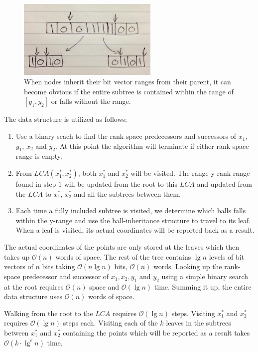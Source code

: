 \begin{figure}[H]
    \centering
    \includegraphics[width=0.6\textwidth]{pictures/bit_vector_split.png}
    \caption{When nodes inherit their bit vector ranges from their parent, it can become obvious if the entire subtree is contained within the range of $[y_1, y_2]$ or falls without the range.}
    \label{fig:bitvectorsplit}
\end{figure}


The data structure is utilized as follows:
\begin{enumerate}
    \item Use a binary seach to find the rank space predecessors and successors of $x_1$, $y_1$, $x_2$ and $y_2$. At this point the algorithm will terminate if either rank space range is empty.
    \item From $LCA(x^*_1, x^*_2)$, both $x^*_1$ and $x^*_2$ will be visited. The range y-rank range found in step $1$ will be updated from the root to this $LCA$ and updated from the $LCA$ to $x^*_1$, $x^*_2$ and all the subtrees between them.
    \item Each time a fully included subtree is visited, we determine which balls falls within the y-range and use the ball-inheritance structure to travel to its leaf. When a leaf is visited, its actual coordinates will be reported back as a result.
\end{enumerate}

The actual coordinates of the points are only stored at the leaves which then takes up $\mathcal{O}(n)$  words of space. The rest of the tree contains $\lg n$ levels of bit vectors of $n$ bits taking $\mathcal{O}(n \lg n)$ bits, $\mathcal{O}(n)$ words. Looking up the rank-space predecessor and successor of $x_1, x_2, y_1$ and $y_2$ using a simple binary search at the root requires $\mathcal{O}(n)$ space and $\mathcal{O}(\lg n)$ time. Summing it up, the entire data structure uses $\mathcal{O}(n)$ words of space. 

Walking from the root to the $LCA$ requires $\mathcal{O}(\lg n)$ steps. Visiting $x^*_1$ and $x^*_2$ requires $\mathcal{O}(\lg n)$ steps each. Visiting each of the $k$ leaves in the subtrees between $x^*_1$ and $x^*_2$ containing the points which will be reported as a result takes $\mathcal{O}(k \cdot \lg^\epsilon n)$ time. 

